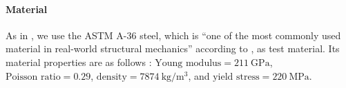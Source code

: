 \paragraph{Material}

As in \cite{Valdez17Topology}, we use the ASTM A-36 steel,
which is ``one of the most commonly used material in
real-world structural mechanics'' according to \cite{Valdez17Topology},
as test material.
Its material properties are as follows \cite{Valdez17Topology}:
$\text{Young modulus} = \SI{211}{\giga\pascal}$,
$\text{Poisson ratio} = 0.29$,
$\text{density} = \SI{7874}{\kilogram\per\meter\cubed}$, and
$\text{yield stress} = \SI{220}{\mega\pascal}$.
